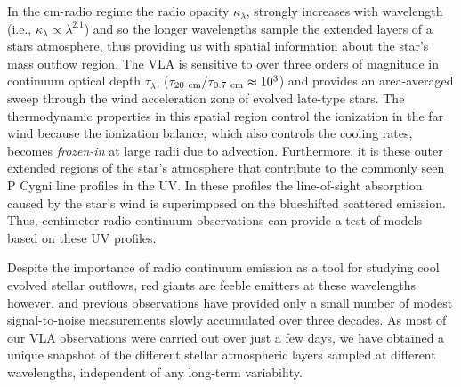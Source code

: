 In the cm-radio regime the radio opacity $ \kappa _{\lambda}$, strongly increases with wavelength (i.e., $ \kappa _{\lambda} \propto \lambda ^{2.1}$) and so the longer wavelengths sample the extended layers of a stars atmosphere, thus providing us with spatial information about the star's mass outflow region. The VLA is sensitive to over three orders of magnitude in continuum optical depth $\tau _{\lambda}$, ($\tau _{20 \ \rm{cm}}/\tau _{0.7 \ \rm{cm}} \approx 10^3$) and provides an area-averaged sweep through the wind acceleration zone of evolved late-type stars. The thermodynamic properties in this spatial region control the ionization in the far wind because the ionization balance, which also controls the cooling rates, becomes \textit{frozen-in} at large radii due to advection. Furthermore, it is these outer extended regions of the star's atmosphere that contribute to the commonly seen P Cygni line profiles in the UV. In these profiles the line-of-sight absorption caused by the star's wind is superimposed on the blueshifted scattered emission. Thus, centimeter radio continuum observations can provide a test of models based on these UV profiles. 

Despite the importance of radio continuum emission as a tool for studying cool evolved stellar outflows, red giants are feeble emitters at these wavelengths however, and previous observations have provided only a small number of modest signal-to-noise measurements slowly accumulated over three decades. As most of our VLA observations were carried out over just a few days, we have obtained a unique snapshot of the different stellar atmospheric layers sampled at different wavelengths, independent of any long-term variability. 

